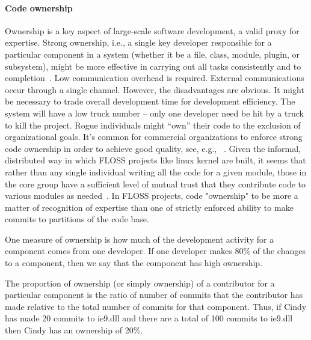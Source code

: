 \documentclass{sig-alternate-05-2015}
\begin{document}
\paragraph{Code ownership}
Ownership is a key aspect of large-scale software development,
 a valid proxy for expertise. Strong ownership, i.e., 
 a single key developer responsible for a particular component in a system (whether
it be a file, class, module, plugin, or subsystem), might be more
effective in carrying out all tasks consistently
and to completion~\cite{nordberg03}.
 Low communication overhead is required. External communications occur
through a single channel.
However, the disadvantages are obvious.
It might be necessary to trade overall development time for development
efficiency.  The system will have a low truck number -- only one developer 
need be hit by a truck to kill the project.
 Rogue individuals might ``own'' their code
to the exclusion of organizational goals.
It's common for commercial organizations to enforce strong code
ownership in order to achieve good quality, see, e.g., ~\cite{bird11}.
Given the informal, distributed way in which FLOSS projects like linux kernel are built, 
it seems that rather than
any single individual writing all the code for a given module, those in the core group
have a sufficient level of mutual trust that they contribute code to various modules as
needed~\cite{MFH02}. In FLOSS projects, code "ownership" to be
more a matter of recognition of expertise than one of strictly enforced ability to make
commits to partitions of the code base.

One measure of ownership
is how much  of  the  development  activity  for  a  component
comes from one developer. If one developer makes 80\% of
the changes to a component, then we say that the component has high 
ownership. 

  The proportion of ownership  (or  simply  ownership)  of  a  contributor  for  a
particular component is the ratio of number of commits that the contributor has made 
relative to the total number of commits for that component.  Thus, if
Cindy has made 20 commits to ie9.dll and there are
a total of 100 commits to ie9.dll then Cindy has an ownership of 20\%.

\end{document}
